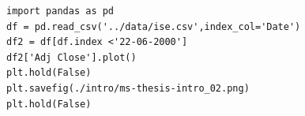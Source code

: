 \begin{figure}[ht]
\vspace{0.6cm}
\end{figure}

\begin{verbatim}
import pandas as pd
df = pd.read_csv('../data/ise.csv',index_col='Date')
df2 = df[df.index <'22-06-2000']
df2['Adj Close'].plot()
plt.hold(False)
plt.savefig(./intro/ms-thesis-intro_02.png)
plt.hold(False)
\end{verbatim}


\begin{figure}[ht]
\vspace{0.6cm}
\end{figure}

